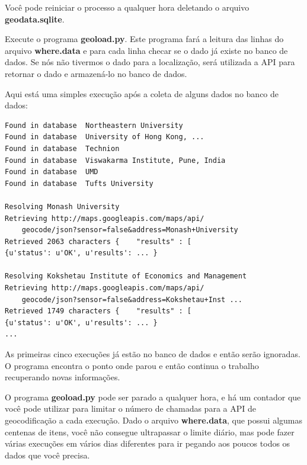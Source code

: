 Você pode reiniciar o processo a qualquer hora deletando o arquivo 
{\bf geodata.sqlite}.

Execute o programa {\bf geoload.py}. Este programa fará a leitura das linhas
do arquivo {\bf where.data} e para cada linha checar se o dado já existe no
banco de dados. Se nós não tivermos o dado para a localização, será utilizada
a API para retornar o dado e armazená-lo no banco de dados.  

Aqui está uma simples execução após a coleta de alguns dados no
banco de dados:

\beforeverb
\begin{verbatim}
Found in database  Northeastern University
Found in database  University of Hong Kong, ...
Found in database  Technion
Found in database  Viswakarma Institute, Pune, India
Found in database  UMD
Found in database  Tufts University

Resolving Monash University
Retrieving http://maps.googleapis.com/maps/api/
    geocode/json?sensor=false&address=Monash+University
Retrieved 2063 characters {    "results" : [  
{u'status': u'OK', u'results': ... }

Resolving Kokshetau Institute of Economics and Management
Retrieving http://maps.googleapis.com/maps/api/
    geocode/json?sensor=false&address=Kokshetau+Inst ...
Retrieved 1749 characters {    "results" : [  
{u'status': u'OK', u'results': ... }
...
\end{verbatim}
\afterverb
%

As primeiras cinco execuções já estão no banco de dados e então serão
ignoradas. O programa encontra o ponto onde parou e então continua
o trabalho recuperando novas informações.

O programa {\bf geoload.py} pode ser parado a qualquer hora, e há um
contador que você pode utilizar para limitar o número de chamadas para a
API de geocodificação a cada execução. Dado o arquivo {\bf where.data}, que
possui algumas centenas de itens, você não consegue ultrapassar o limite diário,
mas pode fazer várias execuções em vários dias diferentes para ir pegando
aos poucos todos os dados que você precisa.

